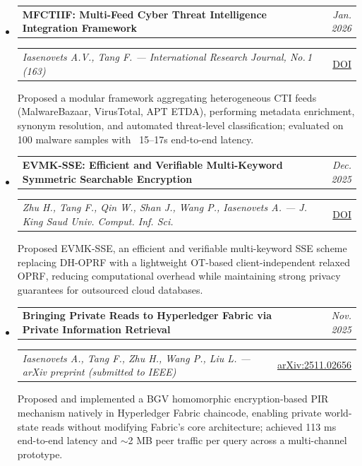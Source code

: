 \documentclass[11pt,letterpaper]{article}
\makeatletter
\newcommand{\headerrow}[2]
{\begin{tabular*}{\linewidth}{l@{\extracolsep{\fill}}r}
#1 & #2 \\
\end{tabular*}}
\makeatother
\begin{document}
\begin{itemize}[leftmargin=0em, itemsep=0.5em]
    \parskip=0.1em
    \renewcommand\labelitemi{}

    \item
    \headerrow
        {\textbf{MFCTIIF: Multi-Feed Cyber Threat Intelligence Integration Framework}}
        {\emph{Jan. 2026}}
    \headerrow
        {\emph{Iasenovets A.V., Tang F. --- International Research Journal, No.\,1 (163)}}
        {\href{https://doi.org/10.60797/IRJ.2026.163.57}{DOI}}
    \vspace{0.1em}
    {\small Proposed a modular framework aggregating heterogeneous CTI feeds (MalwareBazaar, VirusTotal, APT ETDA), performing metadata enrichment, synonym resolution, and automated threat-level classification; evaluated on 100 malware samples with ~15--17s end-to-end latency.}

    \item
    \headerrow
        {\textbf{EVMK-SSE: Efficient and Verifiable Multi-Keyword Symmetric Searchable Encryption}}
        {\emph{Dec. 2025}}
    \headerrow
        {\emph{Zhu H., Tang F., Qin W., Shan J., Wang P., Iasenovets A. --- J. King Saud Univ. Comput. Inf. Sci.}}
        {\href{https://doi.org/10.1007/s44443-025-00405-8}{DOI}}
    \vspace{0.1em}
    {\small Proposed EVMK-SSE, an efficient and verifiable multi-keyword SSE scheme replacing DH-OPRF with a lightweight OT-based client-independent relaxed OPRF, reducing computational overhead while maintaining strong privacy guarantees for outsourced cloud databases.}

    \item
    \headerrow
        {\textbf{Bringing Private Reads to Hyperledger Fabric via Private Information Retrieval}}
        {\emph{Nov. 2025}}
    \headerrow
        {\emph{Iasenovets A., Tang F., Zhu H., Wang P., Liu L. --- arXiv preprint (submitted to IEEE)}}
        {\href{https://arxiv.org/abs/2511.02656}{arXiv:2511.02656}}
    \vspace{0.1em}
    {\small Proposed and implemented a BGV homomorphic encryption-based PIR mechanism natively in Hyperledger Fabric chaincode, enabling private world-state reads without modifying Fabric's core architecture; achieved 113 ms end-to-end latency and $\sim$2 MB peer traffic per query across a multi-channel prototype.}

\end{itemize}

\vspace{0.2cm}
\end{document}
